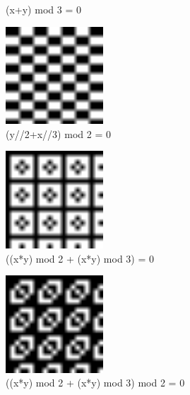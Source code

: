 \begin{figure}[H]
\begin{subfigure}{0.4\textwidth}
    \caption{(x+y) mod 3 = 0}
    \label{fig:qr_mask_3}
  \end{subfigure}
  \begin{subfigure}{0.4\textwidth}
    \centering
    \includegraphics[width=0.4\textwidth]{images/qr_mask_4}
    \caption{(y//2+x//3) mod 2 = 0}
    \label{fig:qr_mask_4}
  \end{subfigure}
  \begin{subfigure}{0.4\textwidth}
    \centering
    \includegraphics[width=0.4\textwidth]{images/qr_mask_5}
    \caption{((x*y) mod 2 + (x*y) mod 3) = 0}
    \label{fig:qr_mask_5}
  \end{subfigure}
  \begin{subfigure}{0.4\textwidth}
    \centering
    \includegraphics[width=0.4\textwidth]{images/qr_mask_6}
    \caption{((x*y) mod 2 + (x*y) mod 3) mod 2 = 0}
    \label{fig:qr_mask_6}
  \end{subfigure}
  \begin{subfigure}{0.4\textwidth}

\end{subfigure}
\end{figure}
